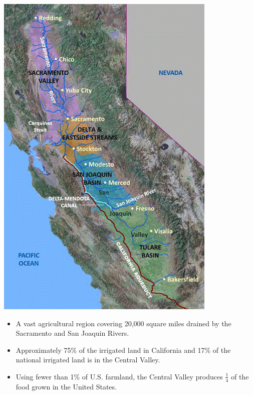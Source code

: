 \documentclass[oneside,a4paper,11pt,explicit]{book}
\begin{document}
\begin{tcolorbox}[colback=yellow!5!white,colframe=IceCreamLeaf,title=\textbf{California's Central Valley}]
	\begin{multicols}{2}

	\centerline{\includegraphics[width=\columnwidth]{CentralValleyUSGS.png}}
	\columnbreak
		\begin{itemize}
			\item A vast agricultural region covering 20,000 square miles drained by the Sacramento and San Joaquin Rivers.
			\item Approximately 75\% of the irrigated land in California and 17\% of the national irrigated land is in the Central Valley.
			\item Using fewer than 1\% of U.S. farmland, the Central Valley produces $\frac{1}{4}$ of the food grown in the United States.

\end{itemize}
\end{multicols}
\end{tcolorbox}
\end{document}
